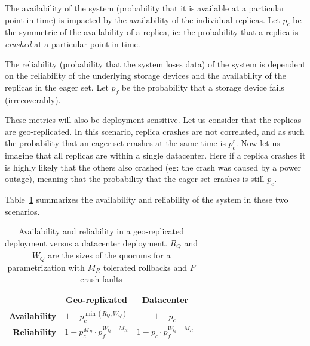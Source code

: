 The availability of the system (probability that it is available
at a particular point in time) is impacted by the availability of
the individual replicas. Let $p_c$ be the symmetric of the
availability of a replica, ie: the probability that a replica is
\emph{crashed} at a particular point in time.

The reliability (probability that the system loses data) of the
system is dependent on the reliability of the underlying storage
devices and the availability of the replicas in the eager set.
Let $p_f$ be the probability that a storage device fails
(irrecoverably).

These metrics will also be deployment sensitive. Let us consider
that the replicas are geo-replicated. In this scenario, replica
crashes are not correlated, and as such the probability that an
eager set crashes at the same time is $p_c^r$. Now let us imagine
that all replicas are within a single datacenter. Here if a
replica crashes it is highly likely that the others also crashed
(eg: the crash was caused by a power outage), meaning that the
probability that the eager set crashes is still $p_c$.

Table~\ref{tab:parametrization} summarizes the availability and
reliability of the system in these two scenarios.

\begin{table}[ht]
    \centering
    \caption{Availability and reliability in a geo-replicated
    deployment versus a datacenter deployment. $R_Q$ and $W_Q$
    are the sizes of the quorums for a parametrization with $M_R$
    tolerated rollbacks and $F$ crash faults}\label{tab:parametrization}
    \begin{tabular}{|r||c|c|}
        \hline
        & \textbf{Geo-replicated} & \textbf{Datacenter} \\ \hline
        \textbf{Availability} & $1 - p_c^{\min(R_Q, W_Q)}$ & $1 - p_c$ \\ \hline
        \textbf{Reliability}  & $1 - p_c^{M_R} \cdot p_f^{W_Q - M_R}$ & $1 - p_c \cdot p_f^{W_Q - M_R}$ \\ \hline
    \end{tabular}\label{tab:parametrization}
\end{table}


